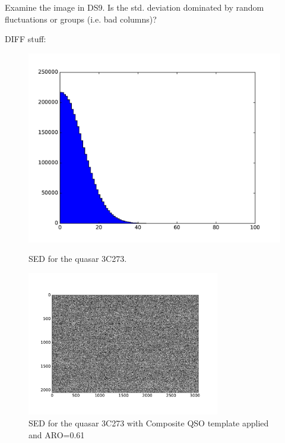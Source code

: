 \documentclass[12pt]{article}
\begin{document}
\begin{onehalfspacing}
Examine the image in DS9. Is the std. deviation dominated by random fluctuations or groups (i.e. bad columns)?


DIFF stuff:


 \begin{figure}[h!]
     \centering
     \begin{minipage}{0.48\textwidth}
         \centering
         \includegraphics[width=1.05\textwidth]{part1_diff-hist} %
         \caption{SED for the quasar 3C273.}
     \end{minipage}\hfill
     \begin{minipage}{0.48\textwidth}
         \centering
         \includegraphics[width=0.75\textwidth]{part1_diff-field} %
         \caption{SED for the quasar 3C273 with Composite QSO template applied and ARO=0.61}
     \end{minipage}\hfill
 \end{figure}










\end{onehalfspacing}
\end{document}
